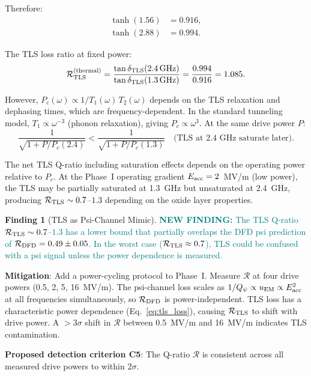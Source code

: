 \documentclass[11pt]{article}
\newcommand{\newfinding}[1]{\textcolor{teal}{\textbf{NEW FINDING:} #1}}
\theoremstyle{definition}
\newtheorem{finding}[theorem]{Finding}
\theoremstyle{remark}
\begin{document}
Therefore:
\begin{align}
\tanh(1.56) &= 0.916, \\
\tanh(2.88) &= 0.994.
\end{align}

The TLS loss ratio at fixed power:
\begin{equation}
\mathcal{R}_{\rm TLS}^{(\rm thermal)} =
\frac{\tan\delta_{\rm TLS}(2.4\,\text{GHz})}
{\tan\delta_{\rm TLS}(1.3\,\text{GHz})}
= \frac{0.994}{0.916} = 1.085.
\label{eq:tls_ratio_thermal}
\end{equation}

However, $P_c(\omega) \propto 1/T_1(\omega)\,T_2(\omega)$ depends on
the TLS relaxation and dephasing times, which are frequency-dependent.
In the standard tunneling model, $T_1 \propto \omega^{-3}$ (phonon
relaxation), giving $P_c \propto \omega^3$. At the same drive power $P$:
\begin{equation}
\frac{1}{\sqrt{1 + P/P_c(2.4)}} < \frac{1}{\sqrt{1 + P/P_c(1.3)}}
\quad\text{(TLS at 2.4 GHz saturate later)}.
\end{equation}

The net TLS Q-ratio including saturation effects depends on the
operating power relative to $P_c$. At the Phase~I operating gradient
$E_{\rm acc} = 2$~MV/m (low power), the TLS may be partially saturated
at 1.3~GHz but unsaturated at 2.4~GHz, producing
$\mathcal{R}_{\rm TLS} \sim 0.7$--$1.3$ depending on the oxide layer
properties.

\begin{finding}[TLS as Psi-Channel Mimic]
\label{find:tls_mimic}
\newfinding{The TLS Q-ratio $\mathcal{R}_{\rm TLS} \sim 0.7$--$1.3$
has a lower bound that partially overlaps the DFD psi prediction
of $\mathcal{R}_{\rm DFD} = 0.49 \pm 0.05$. In the worst case
($\mathcal{R}_{\rm TLS} \approx 0.7$), TLS could be confused with
a psi signal unless the power dependence is measured.}

\textbf{Mitigation}: Add a power-cycling protocol to Phase~I. Measure
$\mathcal{R}$ at four drive powers (0.5, 2, 5, 16~MV/m). The psi-channel
loss scales as $1/Q_\psi \propto u_{\rm EM} \propto E_{\rm acc}^2$
at all frequencies simultaneously, so $\mathcal{R}_{\rm DFD}$ is
power-independent. TLS loss has a characteristic power dependence
(Eq.~\ref{eq:tls_loss}), causing $\mathcal{R}_{\rm TLS}$ to shift
with drive power. A $>$3$\sigma$ shift in $\mathcal{R}$ between
0.5~MV/m and 16~MV/m indicates TLS contamination.

\textbf{Proposed detection criterion C5}: The Q-ratio $\mathcal{R}$
is consistent across all measured drive powers to within $2\sigma$.
\end{finding}
\end{document}
